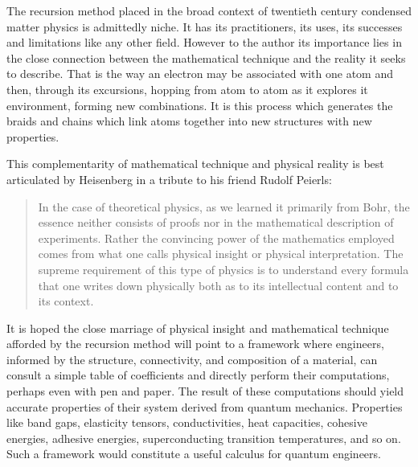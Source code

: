 The recursion method placed in the broad context of twentieth century 
condensed matter physics is admittedly niche. It has its practitioners, 
its uses, its successes and limitations like any other field.
However to the author its importance lies in the close connection between the mathematical
technique and the reality it seeks to describe. That is the way 
an electron may be associated with 
one atom and then, through its excursions, hopping from atom to atom as it explores 
it environment, forming new combinations. It is this process which
generates the braids and chains which link atoms together into new structures 
with new properties.


%

This complementarity of mathematical technique and physical reality 
is best articulated by Heisenberg in a tribute to his friend Rudolf Peierls:
 
\begin{quote}
In the case of theoretical physics, as we learned it primarily from
Bohr, the essence neither consists of proofs
nor in the mathematical description of experiments.
Rather the convincing power of the mathematics employed comes from
what one calls physical insight or physical interpretation. The supreme
requirement of this type of physics is to understand every formula that
one writes down physically both as to its intellectual content and to its context.
\end{quote}
 
It is hoped the close marriage of physical insight and mathematical technique 
afforded by the recursion method will point to a framework where engineers, informed by the
structure, connectivity, and composition of a material, can consult a simple table of
coefficients and directly perform their computations, perhaps even with 
pen and paper. The result of these computations should yield accurate 
properties of their system derived from quantum mechanics.
Properties like band gaps, elasticity tensors, conductivities, 
heat capacities, cohesive energies, adhesive energies, superconducting transition temperatures, 
and so on. Such a framework would constitute a useful calculus for quantum engineers.
